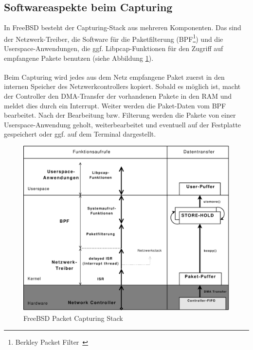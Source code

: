 \subsection{Softwareaspekte beim Capturing}\label{subsec:sw_cap}
In FreeBSD besteht der Capturing-Stack aus mehreren Komponenten.  Das sind der
Netzwerk-Treiber, die Software für die Paketfilterung (BPF\footnote{Berkley
Packet Filter~\cite{bpf_wiki, man_bpf, man_kernel_bpf}}) und die
Userspace-Anwendungen, die ggf.  Libpcap-Funktionen für den Zugriff auf empfangene
Pakete benutzen (siehe Abbildung \ref{bsd_cap_stack}).\\\\
%
Beim Capturing wird jedes aus dem Netz empfangene Paket zuerst in den internen
Speicher des Netzwerkcontrollers kopiert. Sobald es möglich ist, macht der
Controller den DMA-Transfer der vorhandenen Pakete in den RAM und meldet dies
durch ein Interrupt. Weiter werden die Paket-Daten vom BPF bearbeitet. Nach der
Bearbeitung bzw.  Filterung werden die Pakete von einer Userspace-Anwendung
geholt, weiterbearbeitet und eventuell auf der Festplatte gespeichert oder ggf.
auf dem Terminal dargestellt.
\begin{figure}
\centering \includegraphics[width=5.1in]{bilder/3copy}
\caption{FreeBSD Packet Capturing Stack}
\label{bsd_cap_stack}
\end{figure}
%
